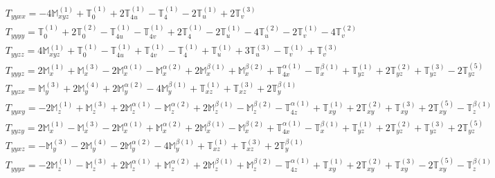 \documentclass[fleqn,8pt,landscape]{jsarticle}
\begin{document}
\begin{align*}
& T_{yyxx} = - 4 \mathbb{M}_{xyz}^{(1)} + \mathbb{T}_{0}^{(1)} + 2 \mathbb{T}_{4u}^{(1)} - \mathbb{T}_{4}^{(1)} - 2 \mathbb{T}_{u}^{(1)} + 2 \mathbb{T}_{v}^{(3)} \\
& T_{yyyy} = \mathbb{T}_{0}^{(1)} + 2 \mathbb{T}_{0}^{(2)} - \mathbb{T}_{4u}^{(1)} - \mathbb{T}_{4v}^{(1)} + 2 \mathbb{T}_{4}^{(1)} - 2 \mathbb{T}_{u}^{(1)} - 4 \mathbb{T}_{u}^{(2)} - 2 \mathbb{T}_{v}^{(1)} - 4 \mathbb{T}_{v}^{(2)} \\
& T_{yyzz} = 4 \mathbb{M}_{xyz}^{(1)} + \mathbb{T}_{0}^{(1)} - \mathbb{T}_{4u}^{(1)} + \mathbb{T}_{4v}^{(1)} - \mathbb{T}_{4}^{(1)} + \mathbb{T}_{u}^{(1)} + 3 \mathbb{T}_{u}^{(3)} - \mathbb{T}_{v}^{(1)} + \mathbb{T}_{v}^{(3)} \\
& T_{yyyz} = 2 \mathbb{M}_{x}^{(1)} + \mathbb{M}_{x}^{(3)} - 2 \mathbb{M}_{x}^{\alpha(1)} - \mathbb{M}_{x}^{\alpha(2)} + 2 \mathbb{M}_{x}^{\beta(1)} + \mathbb{M}_{x}^{\beta(2)} + \mathbb{T}_{4x}^{\alpha(1)} - \mathbb{T}_{x}^{\beta(1)} + \mathbb{T}_{yz}^{(1)} + 2 \mathbb{T}_{yz}^{(2)} + \mathbb{T}_{yz}^{(3)} - 2 \mathbb{T}_{yz}^{(5)} \\
& T_{yyzx} = \mathbb{M}_{y}^{(3)} + 2 \mathbb{M}_{y}^{(4)} + 2 \mathbb{M}_{y}^{\alpha(2)} - 4 \mathbb{M}_{y}^{\beta(1)} + \mathbb{T}_{xz}^{(1)} + \mathbb{T}_{xz}^{(3)} + 2 \mathbb{T}_{y}^{\beta(1)} \\
& T_{yyxy} = - 2 \mathbb{M}_{z}^{(1)} + \mathbb{M}_{z}^{(3)} + 2 \mathbb{M}_{z}^{\alpha(1)} - \mathbb{M}_{z}^{\alpha(2)} + 2 \mathbb{M}_{z}^{\beta(1)} - \mathbb{M}_{z}^{\beta(2)} - \mathbb{T}_{4z}^{\alpha(1)} + \mathbb{T}_{xy}^{(1)} + 2 \mathbb{T}_{xy}^{(2)} + \mathbb{T}_{xy}^{(3)} + 2 \mathbb{T}_{xy}^{(5)} - \mathbb{T}_{z}^{\beta(1)} \\
& T_{yyzy} = 2 \mathbb{M}_{x}^{(1)} - \mathbb{M}_{x}^{(3)} - 2 \mathbb{M}_{x}^{\alpha(1)} + \mathbb{M}_{x}^{\alpha(2)} + 2 \mathbb{M}_{x}^{\beta(1)} - \mathbb{M}_{x}^{\beta(2)} + \mathbb{T}_{4x}^{\alpha(1)} - \mathbb{T}_{x}^{\beta(1)} + \mathbb{T}_{yz}^{(1)} + 2 \mathbb{T}_{yz}^{(2)} + \mathbb{T}_{yz}^{(3)} + 2 \mathbb{T}_{yz}^{(5)} \\
& T_{yyxz} = - \mathbb{M}_{y}^{(3)} - 2 \mathbb{M}_{y}^{(4)} - 2 \mathbb{M}_{y}^{\alpha(2)} - 4 \mathbb{M}_{y}^{\beta(1)} + \mathbb{T}_{xz}^{(1)} + \mathbb{T}_{xz}^{(3)} + 2 \mathbb{T}_{y}^{\beta(1)} \\
& T_{yyyx} = - 2 \mathbb{M}_{z}^{(1)} - \mathbb{M}_{z}^{(3)} + 2 \mathbb{M}_{z}^{\alpha(1)} + \mathbb{M}_{z}^{\alpha(2)} + 2 \mathbb{M}_{z}^{\beta(1)} + \mathbb{M}_{z}^{\beta(2)} - \mathbb{T}_{4z}^{\alpha(1)} + \mathbb{T}_{xy}^{(1)} + 2 \mathbb{T}_{xy}^{(2)} + \mathbb{T}_{xy}^{(3)} - 2 \mathbb{T}_{xy}^{(5)} - \mathbb{T}_{z}^{\beta(1)} \\

\end{align*}
\end{document}
